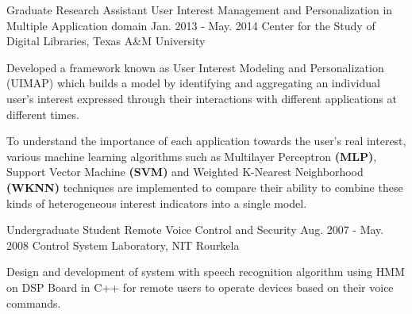 

\begin{cventries}

  \cventry
    {Graduate Research Assistant} %
    {User Interest Management and Personalization in Multiple Application domain} %
    {Jan. 2013 - May. 2014} %
    {Center for the Study of Digital Libraries, Texas A\&M University} %
    {
      \begin{cvitems} %
        \item {Developed a framework known as User Interest Modeling and Personalization (UIMAP) which builds a model
		by identifying and aggregating an individual user's interest expressed through their interactions with different
		applications at different times.}
	\item {To understand the importance of each application towards the user's real interest, various machine learning
		algorithms such as Multilayer Perceptron \textbf{(MLP)}, Support Vector Machine \textbf{(SVM)} and Weighted K-Nearest
		Neighborhood \textbf{(WKNN)} techniques are implemented to compare their ability to combine these kinds of
		heterogeneous interest indicators into a single model.}
      \end{cvitems}
    }

  \cventry
    {Undergraduate Student} %
    {Remote Voice Control and Security} %
    {Aug. 2007 - May. 2008} %
    {Control System Laboratory, NIT Rourkela} %
    {
      \begin{cvitems} %
        \item {Design and development of system with speech recognition algorithm using HMM on DSP Board in C++ for remote users to operate devices based on their voice commands.}
      \end{cvitems}
    }

\end{cventries}
